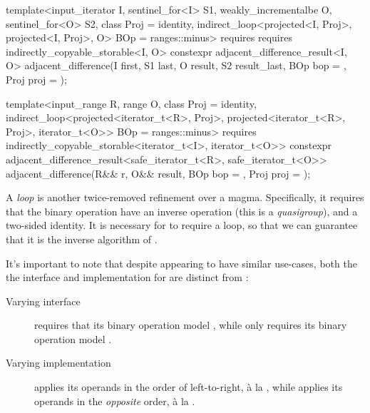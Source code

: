 \begin{itemdecl}
template<input_iterator I, sentinel_for<I> S1, weakly_incrementalbe O, sentinel_for<O> S2,
         class Proj = identity,
         indirect_loop<projected<I, Proj>, projected<I, Proj>, O> BOp = ranges::minus>
  requires requires indirectly_copyable_storable<I, O>
constexpr adjacent_difference_result<I, O>
  adjacent_difference(I first, S1 last, O result, S2 result_last, BOp bop = {}, Proj proj = {});

template<input_range R, range O, class Proj = identity,
         indirect_loop<projected<iterator_t<R>, Proj>,
                       projected<iterator_t<R>, Proj>,
                       iterator_t<O>> BOp = ranges::minus>
  requires indirectly_copyable_storable<iterator_t<I>, iterator_t<O>>
constexpr adjacent_difference_result<safe_iterator_t<R>, safe_iterator_t<O>>
  adjacent_difference(R&& r, O&& result, BOp bop = {}, Proj proj = {});
\end{itemdecl}
\begin{itemdescr}
   \pnum
   A \textit{loop} is another twice-removed refinement over a magma. Specifically, it requires that
   the binary operation have an inverse operation (this is a
   \textit{quasigroup}\cite{wikipedia_quasigroup}), and a two-sided identity. It is necessary for
    to require a loop, so that we can guarantee that it is the inverse
   algorithm of .

   It's important to note that despite appearing to have similar use-cases, both the the interface
   and implementation for  are distinct from
   :

   \begin{description}
      \item[Varying interface]
          requires that its binary operation model
         , while  only
         requires its binary operation model
         .
      \item[Varying implementation]
          applies its operands in the order of left-to-right, à la
         , while  applies its operands in the
         \textit{opposite} order, à la .
   \end{description}
\end{itemdescr}

